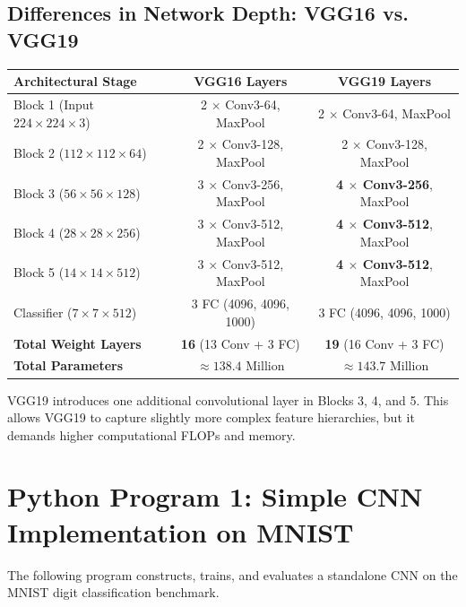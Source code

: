 \documentclass[12pt,a4paper]{article}
\begin{document}
\subsection{Differences in Network Depth: VGG16 vs. VGG19}
\begin{center}
\small
\begin{tabular}{lcc}\toprule
\textbf{Architectural Stage} & \textbf{VGG16 Layers} & \textbf{VGG19 Layers} \\\midrule
Block 1 (Input $224 \times 224 \times 3$) & 2 $\times$ Conv3-64, MaxPool & 2 $\times$ Conv3-64, MaxPool \\
Block 2 ($112 \times 112 \times 64$) & 2 $\times$ Conv3-128, MaxPool & 2 $\times$ Conv3-128, MaxPool \\
Block 3 ($56 \times 56 \times 128$) & 3 $\times$ Conv3-256, MaxPool & \textbf{4 $\times$ Conv3-256}, MaxPool \\
Block 4 ($28 \times 28 \times 256$) & 3 $\times$ Conv3-512, MaxPool & \textbf{4 $\times$ Conv3-512}, MaxPool \\
Block 5 ($14 \times 14 \times 512$) & 3 $\times$ Conv3-512, MaxPool & \textbf{4 $\times$ Conv3-512}, MaxPool \\
Classifier ($7 \times 7 \times 512$) & 3 FC (4096, 4096, 1000) & 3 FC (4096, 4096, 1000) \\\midrule
\textbf{Total Weight Layers} & \textbf{16} (13 Conv + 3 FC) & \textbf{19} (16 Conv + 3 FC) \\
\textbf{Total Parameters} & $\approx 138.4$ Million & $\approx 143.7$ Million \\\bottomrule
\end{tabular}
\end{center}
VGG19 introduces one additional convolutional layer in Blocks 3, 4, and 5. This allows VGG19 to capture slightly more complex feature hierarchies, but it demands higher computational FLOPs and memory.

\section{Python Program 1: Simple CNN Implementation on MNIST}
The following program constructs, trains, and evaluates a standalone CNN on the MNIST digit classification benchmark.
\end{document}
